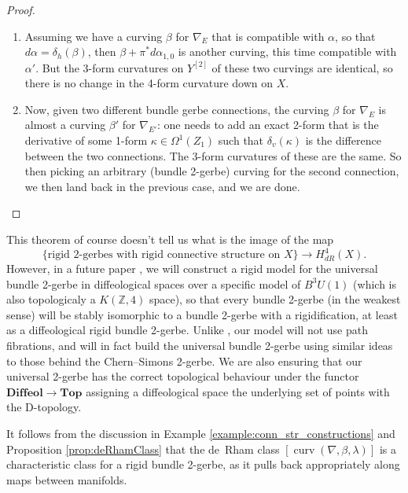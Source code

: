 \documentclass[12pt]{amsart}
\theoremstyle{plain}
\theoremstyle{definition}
\theoremstyle{remark}
\numberwithin{equation}{section}
\newcommand{\ZZ}{{\mathbb Z}}
\DeclareMathOperator{\curv}{curv}
\newcommand{\<}{\langle}
\renewcommand{\>}{\rangle}
\begin{document}
\begin{proof}
\begin{enumerate}
\item Assuming we have a curving $\beta$ for $\nabla_E$ that is compatible with $\alpha$, so that $d\alpha = \delta_h(\beta)$, then $\beta + \pi^*d\alpha_{1,0}$ is another curving, this time compatible with $\alpha'$. 
But the 3-form curvatures on $Y^{[2]}$ of these two curvings are identical, so there is no change in the 4-form curvature down on $X$.

\item Now, given two different bundle gerbe connections, the curving $\beta$ for $\nabla_E$ is almost a curving $\beta'$ for $\nabla_{E'}$: one needs to add an exact 2-form that is the derivative of some 1-form $\kappa\in \Omega^1(Z_1)$ such that $\delta_v(\kappa)$ is the difference between the two connections. 
The 3-form curvatures of these are the same. 
So then picking an arbitrary (bundle 2-gerbe) curving for the second connection, we then land back in the previous case, and we are done.\qedhere
\end{enumerate}
\end{proof}

This theorem of course doesn't tell us what is the image of the map 
\begin{equation}\label{eq:char_class}
  \{\text{rigid 2-gerbes with rigid connective structure on } X\} \to H^4_{dR}(X).
\end{equation}
However, in a future paper \cite{rb2g_II}, we will construct a rigid model for the universal bundle 2-gerbe in diffeological spaces over a specific model of $B^3U(1)$ (which is also topologicaly a $K(\ZZ,4)$ space), so that every bundle 2-gerbe (in the weakest sense) will be stably isomorphic to a bundle 2-gerbe with a rigidification, at least as a diffeological rigid bundle 2-gerbe.
Unlike \cite[Theorem 3.15]{KM19}, our model will not use path fibrations, and will in fact build the universal bundle 2-gerbe using similar ideas to those behind the Chern--Simons 2-gerbe.
We are also ensuring that our universal 2-gerbe has the correct topological behaviour under the functor $\mathbf{Diffeol} \to \mathbf{Top}$ assigning a diffeological space the underlying set of points with the D-topology.



It follows from the discussion in Example \ref{example:conn_str_constructions} and Proposition \ref{prop:deRhamClass} that the de~Rham class $[\curv(\nabla,\beta,\lambda)]$ is a characteristic class for a rigid bundle 2-gerbe, as it pulls back appropriately along maps between manifolds.
\end{document}
